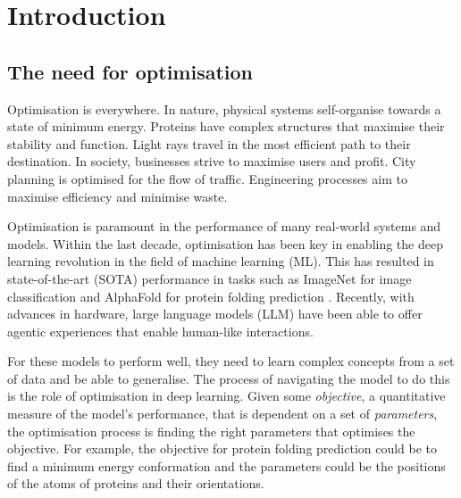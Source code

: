 \chapter{Introduction}
\label{chap:introduction}


\section{The need for optimisation}
\label{sec:optimisation_need}

Optimisation is everywhere. In nature, physical systems self-organise towards a state of minimum energy. Proteins have complex structures that maximise their stability and function. Light rays travel in the most efficient path to their destination. In society, businesses strive to maximise users and profit. City planning is optimised for the flow of traffic. Engineering processes aim to maximise efficiency and minimise waste.

Optimisation is paramount in the performance of many real-world systems and models. Within the last decade, optimisation has been key in enabling the deep learning revolution in the field of machine learning (ML). This has resulted in state-of-the-art (SOTA) performance in tasks such as ImageNet for image classification \citep{imagenet} and AlphaFold for protein folding prediction \citep{alphafold}. Recently, with advances in hardware, large language models (LLM) have been able to offer agentic experiences that enable human-like interactions. 

For these models to perform well, they need to learn complex concepts from a set of data and be able to generalise. The process of navigating the model to do this is the role of optimisation in deep learning. Given some \textit{objective}, a quantitative measure of the model's performance, that is dependent on a set of \textit{parameters}, the optimisation process is finding the right parameters that optimises the objective. For example, the objective for protein folding prediction could be to find a minimum energy conformation and the parameters could be the positions of the atoms of proteins and their orientations. 

